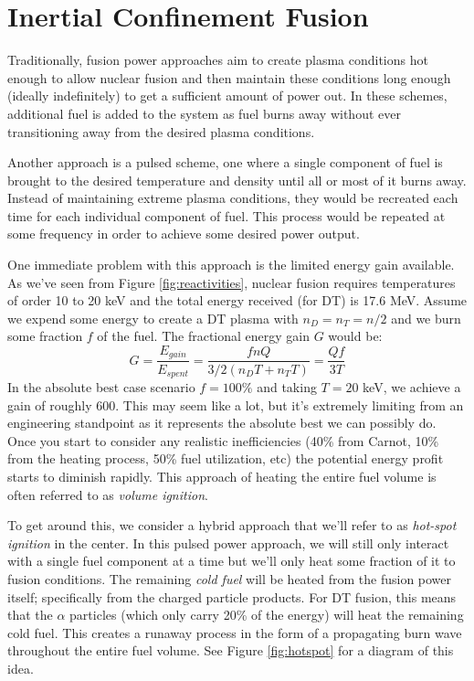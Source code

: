\section{Inertial Confinement Fusion}
\label{sec:ICF}

	Traditionally, fusion power approaches aim to create plasma conditions hot enough to allow nuclear fusion and then maintain these conditions long enough (ideally indefinitely) to get a sufficient amount of power out. In these schemes, additional fuel is added to the system as fuel burns away without ever transitioning away from the desired plasma conditions. 
	
	Another approach is a pulsed scheme, one where a single component of fuel is brought to the desired temperature and density until all or most of it burns away. Instead of maintaining extreme plasma conditions, they would be recreated each time for each individual component of fuel. This process would be repeated at some frequency in order to achieve some desired power output.
	
	One immediate problem with this approach is the limited energy gain available. As we've seen from Figure \ref{fig:reactivities}, nuclear fusion requires temperatures of order 10 to 20 keV and the total energy received (for DT) is 17.6 MeV. Assume we expend some energy to create a DT plasma with $n_D=n_T=n/2$ and we burn some fraction $f$ of the fuel. The fractional energy gain $G$ would be:
	\begin{equation}
		G = \frac{E_{gain}}{E_{spent}} = \frac{fnQ}{3/2\left(n_DT + n_TT\right)} = \frac{Qf}{3T}
	\end{equation}
	In the absolute best case scenario $f=100\%$ and taking $T=20$ keV, we achieve a gain of roughly 600. This may seem like a lot, but it's extremely limiting from an engineering standpoint as it represents the absolute best we can possibly do. Once you start to consider any realistic inefficiencies (40\% from Carnot, 10\% from the heating process, 50\% fuel utilization, etc) the potential energy profit starts to diminish rapidly. This approach of heating the entire fuel volume is often referred to as \emph{volume ignition}.
	
	To get around this, we consider a hybrid approach that we'll refer to as \emph{hot-spot ignition} in the center. In this pulsed power approach, we will still only interact with a single fuel component at a time but we'll only heat some fraction of it to fusion conditions. The remaining \emph{cold fuel} will be heated from the fusion power itself; specifically from the charged particle products. For DT fusion, this means that the $\alpha$ particles (which only carry 20\% of the energy) will heat the remaining cold fuel. This creates a runaway process in the form of a propagating burn wave throughout the entire fuel volume. See Figure \ref{fig:hotspot} for a diagram of this idea.
	
